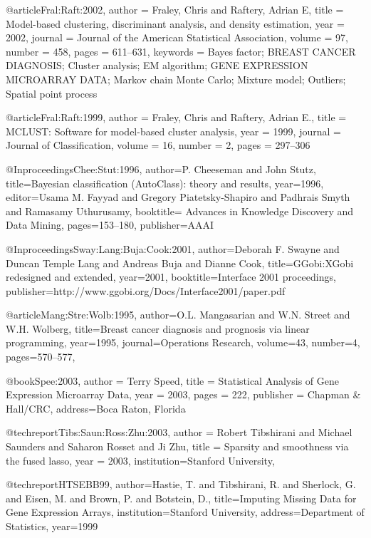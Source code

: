@article{Fral:Raft:2002,
    author = {Fraley, Chris and Raftery, Adrian E},
    title = {Model-based clustering, discriminant analysis, and
density estimation},
    year = {2002},
    journal = {Journal of the American Statistical Association},
    volume = {97},
    number = {458},
    pages = {611--631},
    keywords = {Bayes factor; BREAST CANCER DIAGNOSIS; Cluster
analysis; EM algorithm; GENE EXPRESSION MICROARRAY DATA; Markov chain
Monte Carlo; Mixture model; Outliers; Spatial point process}
}

@article{Fral:Raft:1999,
    author = {Fraley, Chris and Raftery, Adrian E.},
    title = {M{CLUST}: {S}oftware for model-based cluster analysis},
    year = {1999},
    journal = {Journal of Classification},
    volume = {16},
    number = {2},
    pages = {297--306}
}

@Inproceedings{Chee:Stut:1996,
  author={P. Cheeseman and John Stutz},
  title={{B}ayesian classification ({AutoClass}): theory and results},
  year={1996},
  editor={Usama M. Fayyad and Gregory Piatetsky-Shapiro and Padhrais
Smyth and Ramasamy Uthurusamy},
  booktitle={ Advances in Knowledge Discovery and Data Mining},
  pages={153--180},
  publisher={AAAI}
}

@Inproceedings{Sway:Lang:Buja:Cook:2001,
  author={Deborah F. Swayne and Duncan Temple Lang and Andreas Buja
and Dianne Cook},
  title={{GGobi}:{XGobi} redesigned and extended},
  year=2001,
  booktitle={Interface 2001 proceedings},
  publisher={http://www.ggobi.org/Docs/Interface2001/paper.pdf}
}


@article{Mang:Stre:Wolb:1995,
  author={O.L. Mangasarian and W.N. Street and W.H. Wolberg},
  title={Breast cancer diagnosis and prognosis via linear programming},
  year={1995},
  journal={Operations Research},
  volume=43,
  number=4,
  pages={570--577},
}


@book{Spee:2003,
    author = {Terry Speed},
    title = {Statistical Analysis of Gene Expression Microarray Data},
    year = {2003},
    pages = {222},
    publisher = {Chapman \& Hall/CRC},
    address={Boca Raton, Florida}
}

@techreport{Tibs:Saun:Ross:Zhu:2003,
    author = {Robert Tibshirani and Michael Saunders and Saharon Rosset and Ji Zhu},
    title = {Sparsity and smoothness via the fused lasso},
    year = 2003,
    institution={Stanford University},
}

@techreport{HTSEBB99,
  author={Hastie, T. and Tibshirani, R. and Sherlock, G. and Eisen, M.  and
Brown, P. and Botstein, D.},
  title={Imputing Missing Data for Gene Expression Arrays},
  institution={Stanford University},
  address={Department of Statistics},
  year=1999}


